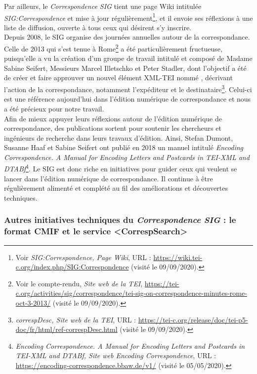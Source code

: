 Par ailleurs, le \emph{Correspondence SIG} tient une page Wiki intitulée \emph{SIG:Correspondence} et mise à jour régulièrement\footnote{Voir \emph{SIG:Correspondence, Page Wiki}, URL : \url{https://wiki.tei-c.org/index.php/SIG:Correspondence} (visité le 09/09/2020).}, et il envoie ses réflexions à une liste de diffusion, ouverte à tous ceux qui désirent s'y inscrire.\\

Depuis 2008, le SIG organise des journées annuelles autour de la correspondance. Celle de 2013 qui s'est tenue à Rome\footnote{Voir le compte-rendu, \emph{Site web de la TEI}, \url{https://tei-c.org/activities/sig/correspondence/tei-sig-on-correspondence-minutes-rome-oct-3-2013/} (visité le 09/09/2020).} a été particulièrement fructueuse, puisqu'elle a vu la création d'un groupe de travail intitulé  et composé de Madame Sabine Seifert, Messieurs Marcel Illetschko et Peter Stadler, dont l'objectif a été de créer et faire approuver un nouvel élément XML-TEI nommé , décrivant l'action de la correspondance, notamment l'expéditeur et le destinataire\footnote{\emph{correspDesc, Site web de la TEI}, URL : \url{https://tei-c.org/release/doc/tei-p5-doc/fr/html/ref-correspDesc.html} (visité le 09/09/2020).}. Celui-ci est une référence aujourd'hui dans l'édition numérique de correspondance et nous a été précieux pour notre travail.\\

Afin de mieux appuyer leurs réflexions autour de l'édition numérique de correspondance, des publications sortent pour soutenir les chercheurs et ingénieurs de recherche dans leurs travaux d'édition. Ainsi, Stefan Dumont, Susanne Haaf et Sabine Seifert ont publié en 2018 un manuel intitulé \emph{Encoding Correspondence. A Manual for Encoding Letters and Postcards in TEI-XML and DTABf}\footnote{\emph{Encoding Correspondence. A Manual for Encoding Letters and Postcards in TEI-XML and DTABf, Site web Encoding Correspondence}, URL : \url{https://encoding-correspondence.bbaw.de/v1/} (visité le 05/05/2020).}. Le SIG est donc riche en initiatives pour guider ceux qui veulent se lancer dans l'édition numérique de correspondance. Il continue à 
être régulièrement alimenté et complété au fil des améliorations et découvertes techniques. \\

\subsubsection{Autres initiatives techniques du \emph{Correspondence SIG} : le format CMIF et le service <CorrespSearch>}

